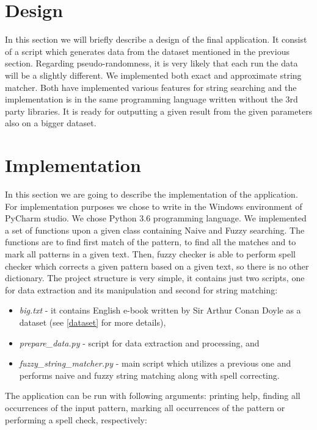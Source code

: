 \documentclass[12pt,a4paper,titlepage,final]{article}
\begin{document}
\section{Design}  \label{design}
In this section we will briefly describe a design of the final application. It consist of a script which generates data from the dataset mentioned in the previous section. Regarding pseudo-randomness, it is very likely that each run the data will be a slightly different. We implemented both exact and approximate string matcher. Both have implemented various features for string searching and the implementation is in the same programming language written without the 3rd party libraries. It is ready for outputting a given result from the given parameters also on a bigger dataset.



\section{Implementation} \label{impl}
In this section we are going to describe the implementation of the application. For implementation purposes we chose to write in the Windows environment of PyCharm studio. We chose Python 3.6 programming language. We implemented a set of functions upon a given class containing Naive and Fuzzy searching. The functions are to find first match of the pattern, to find all the matches and to mark all patterns in a given text. Then, fuzzy checker is able to perform spell checker which corrects a given pattern based on a given text, so there is no other dictionary. The project structure is very simple, it contains just two scripts, one for data extraction and its manipulation and second for string matching:
	\begin{itemize}
		\item \textit{big.txt} - it contains English e-book written by Sir Arthur Conan Doyle as a dataset (see \ref{dataset} for more details),
		\item \textit{prepare\_data.py} - script for data extraction and processing, and
		\item \textit{fuzzy\_string\_matcher.py} - main script which utilizes a previous one and performs naive and fuzzy string matching along with spell correcting. 
	\end{itemize}

The application can be run with following arguments: printing help, finding all occurrences of the input pattern, marking all occurrences of the pattern or performing a spell check, respectively:
\end{document}
